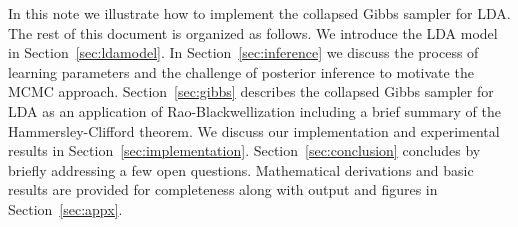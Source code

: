 \documentclass{article}%
\theoremstyle{definition}
\begin{document}
In this note we illustrate how to implement the collapsed Gibbs sampler for LDA. The rest of this document is organized as follows. We introduce the LDA model in Section~\ref{sec:ldamodel}. In Section~\ref{sec:inference} we discuss the process of learning parameters and the challenge of posterior inference to motivate the MCMC approach. Section~\ref{sec:gibbs} describes the collapsed Gibbs sampler for LDA as an application of Rao-Blackwellization including a brief summary of the Hammersley-Clifford theorem. We discuss our implementation and experimental results in Section~\ref{sec:implementation}. Section~\ref{sec:conclusion} concludes by briefly addressing a few open questions. Mathematical derivations and basic results are provided for completeness along with output and figures in Section~\ref{sec:appx}.


\end{document}
